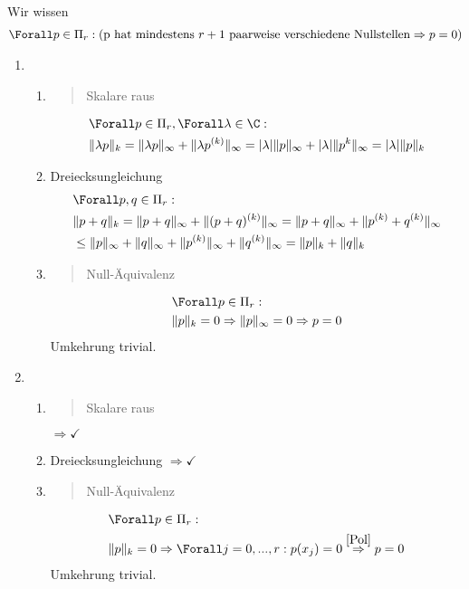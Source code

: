\begin{solution}
Wir wissen
\begin{align}\label{Pol}
  \Forall p \in \Pi_r :(\text{p hat mindestens $r+1$ paarweise verschiedene Nullstellen} \Rightarrow p = 0)
\end{align}
\begin{enumerate}[label = \textbf{\alph*)}]
  \item
  \begin{enumerate}[label = \textit{\roman*)}]
    \item \blockquote{Skalare raus} \begin{align*}
      & \Forall p \in \Pi_r, \Forall \lambda \in \C: \\
      & \|\lambda p\|_k = \|\lambda p\|_\infty + \|\lambda p^{(k)}\|_\infty = |\lambda| \|p\|_\infty + |\lambda| \|p^{k}\|_\infty = |\lambda| \|p\|_k
    \end{align*}
    \item Dreiecksungleichung \begin{align*}
      &\Forall p,q \in \Pi_r: \\
      & \|p+q\|_k = \|p+q\|_\infty + \|(p+q)^{(k)}\|_\infty = \|p+q\|_\infty + \|p^{(k)}+q^{(k)}\|_\infty\\
      &\leq \|p\|_\infty + \|q\|_\infty + \|p^{(k)}\|_\infty + \|q^{(k)}\|_\infty = \|p\|_k + \|q\|_k
    \end{align*}
    \item \blockquote{Null-Äquivalenz} \begin{align*}
      &\Forall p \in \Pi_r: \\
      & \|p\|_k = 0 \Rightarrow \|p\|_\infty = 0 \Rightarrow p = 0
    \end{align*}
    Umkehrung trivial.
  \end{enumerate}
  \item
  \begin{enumerate}[label = \textit{\roman*)}]
    \item \blockquote{Skalare raus} $\Rightarrow \checkmark$
    \item Dreiecksungleichung $\Rightarrow \checkmark$
    \item \blockquote{Null-Äquivalenz} \begin{align*}
      &\Forall p \in \Pi_r: \\
      & \|p\|_k = 0 \Rightarrow \Forall j=0,...,r: p(x_j) = 0 \stackrel{\eqref{Pol}}{\Rightarrow} p = 0
    \end{align*}
    Umkehrung trivial.
  \end{enumerate}

\end{enumerate}
\end{solution}
